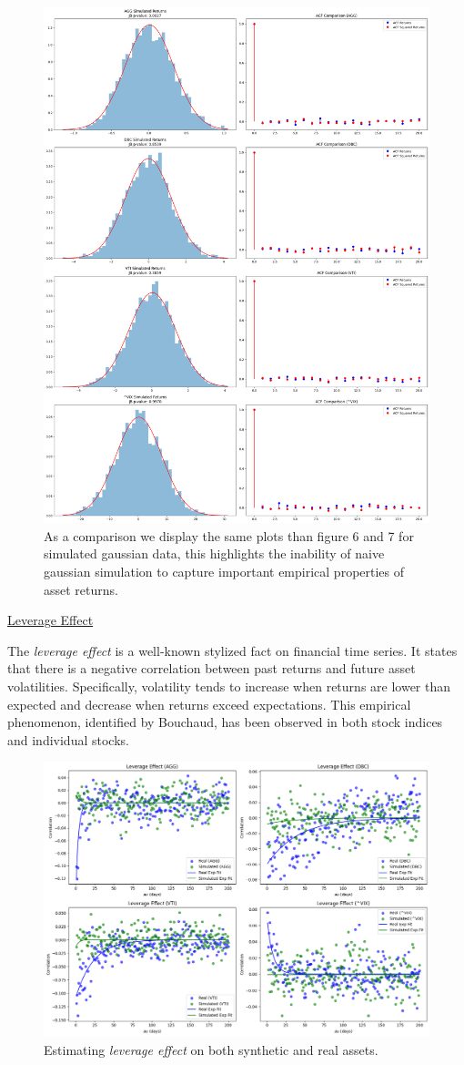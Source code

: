 \documentclass[11pt]{article}
\begin{document}
\begin{figure}
    \centering
    \includegraphics[width=0.5\linewidth]{images/multivariate_gaussian_estimated_distrib_acf.png}
    \caption{As a comparison we display the same plots than figure 6 and 7 for simulated gaussian data, this highlights the inability of naive gaussian simulation to capture important empirical properties of asset returns.}
    \label{fig:enter-label}
\end{figure}

\clearpage

\underline{Leverage Effect}  
 

The \textit{leverage effect} is a well-known stylized fact on financial time series. It states that there is a negative correlation between past returns and future asset volatilities. Specifically, volatility tends to increase when returns are lower than expected and decrease when returns exceed expectations. This empirical phenomenon, identified by Bouchaud, has been observed in both stock indices and individual stocks.


\begin{figure}
    \centering
    \includegraphics[width=1\linewidth]{images/leverage_effect.png}
    \caption{Estimating \textit{leverage effect} on both synthetic and real assets.}
    \label{fig:enter-label}
\end{figure}
\end{document}

